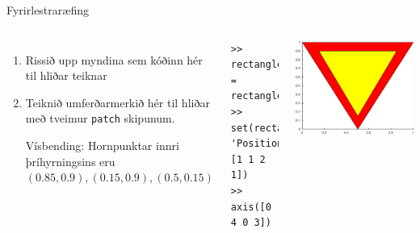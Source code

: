 \documentclass[handout]{beamer}
\begin{document}
\begin{frame}[fragile]{Fyrirlestraræfing}
\begin{columns}
\begin{enumerate}
 \setcounter{enumi}{0}
 \item Rissið upp myndina sem kóðinn hér til hliðar teiknar
 \item Teiknið umferðarmerkið hér til hliðar með tveimur \texttt{patch} skipunum. 
 
 Vísbending: Hornpunktar innri þríhyrningsins eru $(0.85,0.9), (0.15,0.9), (0.5,0.15)$
\end{enumerate}
\begin{verbatim}
>> rectangleH = rectangle();
>> set(rectangleH, 'Position', [1 1 2 1])
>> axis([0 4 0 3])
\end{verbatim}
\begin{center}
\includegraphics[width=0.8\linewidth]{Pics/bidskylda}
\end{center}
\end{columns}
\end{frame}
\end{document}
